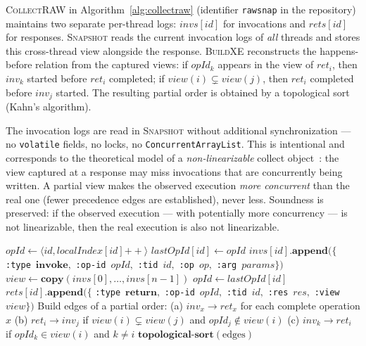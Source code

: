 \documentclass[preprint,12pt]{elsarticle}
\begin{document}

\textsc{CollectRAW} in Algorithm~\ref{alg:collectraw} 
(identifier \texttt{rawsnap} in the repository)
maintains two separate per-thread logs:
$\mathit{invs}[id]$ for invocations and $\mathit{rets}[id]$ for responses.
\textsc{Snapshot} reads the current invocation logs of
\emph{all} threads and stores this cross-thread view alongside the
response. \textsc{BuildXE} reconstructs the happens-before relation from
the captured views: if $opId_k$ appears in the view of $ret_i$, then
$inv_k$ started before $ret_i$ completed; if $view(i) \subsetneq view(j)$,
then $ret_i$ completed before $inv_j$ started. The resulting partial order
is obtained by a topological sort (Kahn's algorithm).


The invocation logs are read in \textsc{Snapshot} without additional
synchronization --- no \texttt{volatile} fields, no locks, no
\texttt{ConcurrentArrayList}. This is intentional and corresponds to the
theoretical model of a \emph{non-linearizable} collect object~\cite{RC24}:
the view captured at a response may miss invocations that are concurrently
being written. A partial view makes the observed execution \emph{more
concurrent} than the real one (fewer precedence edges are established),
never less. Soundness is preserved: if the observed execution --- with
potentially more concurrency --- is not linearizable, then the real
execution is also not linearizable.

\begin{algorithm}[H]
\scriptsize
\caption{\textsc{CollectRAW}: write, snapshot, and buildXE}
\label{alg:collectraw}
\begin{algorithmic}[1]
  \State $opId \gets \langle id, localIndex[id]\mathtt{++} \rangle$
  \State $lastOpId[id] \gets opId$
  \State $\mathit{invs}[id].\textbf{append}(\{$
      \texttt{:type}~$\mathbf{invoke},$
      \texttt{:op-id}~$opId,$
      \texttt{:tid}~$id,$
      \texttt{:op}~$op,$
      \texttt{:arg}~$params\})$
\EndProcedure
{}
  \State $view \gets \textbf{copy}(\mathit{invs}[0], \ldots, \mathit{invs}[n{-}1])$
  \State $opId \gets lastOpId[id]$
  \State $\mathit{rets}[id].\textbf{append}(\{$
      \texttt{:type}~$\mathbf{return},$
      \texttt{:op-id}~$opId,$
      \texttt{:tid}~$id,$
      \texttt{:res}~$res,$
      \texttt{:view}~$view\})$
\EndProcedure
{}
  \State Build edges of a partial order:
  \State \quad (a) $inv_x \to ret_x$ for each complete operation $x$
  \State \quad (b) $ret_i \to inv_j$ if
      $\mathit{view}(i) \subsetneq \mathit{view}(j)$
      and $opId_j \notin \mathit{view}(i)$
  \State \quad (c) $inv_k \to ret_i$ if
      $opId_k \in \mathit{view}(i)$
      and $k \neq i$
  \State \Return $\textbf{topological-sort}(\text{edges})$
\EndProcedure
\end{algorithmic}
\end{algorithm}
\end{document}
